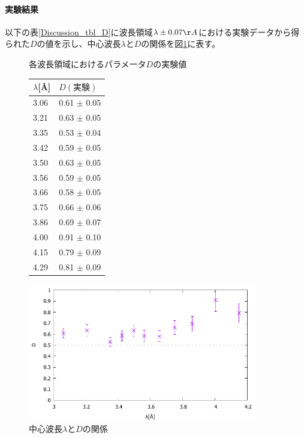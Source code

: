 \paragraph{実験結果}
以下の表\ref{Discussion_tbl_D}に波長領域$\lambda \pm 0.07 \AA$における実験データから得られた$D$の値を示し、中心波長$\lambda$と$D$の関係を図\ref{Discussion_fig_D}に表す。
\begin{figure}[H]
\begin{minipage}{0.35\hsize}
\centering
\makeatletter
\def\@captype{table}
\makeatother
\caption{各波長領域におけるパラメータ$D$の実験値} \label{Discussion_tbl_D}
\begin{tabular}{ll}
$\lambda$[\AA] &  $D(実験)$\\ \hline
3.06 	&	0.61 	$\pm$	0.05 	\\
3.21 	&	0.63 	$\pm$	0.05 	\\
3.35 	&	0.53 	$\pm$	0.04 	\\
3.42 	&	0.59 	$\pm$	0.05 	\\
3.50 	&	0.63 	$\pm$	0.05 	\\
3.56 	&	0.59 	$\pm$	0.05 	\\
3.66 	&	0.58 	$\pm$	0.05 	\\
3.75 	&	0.66 	$\pm$	0.06 	\\
3.86 	&	0.69 	$\pm$	0.07 	\\
4.00 	&	0.91 	$\pm$	0.10 	\\
4.15 	&	0.79 	$\pm$	0.09 	\\
4.29 	&	0.81 	$\pm$	0.09 	\\ \hline
\end{tabular}
\end{minipage}
\begin{minipage}{0.65\hsize}
\centering
\vspace{2.5cm}
\includegraphics[width=10cm]{discussion/D/D_F.pdf}
\caption{中心波長$\lambda$と$D$の関係} \label{Discussion_fig_D}
\end{minipage}
\end{figure}

